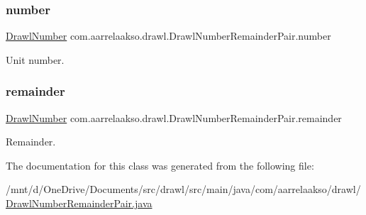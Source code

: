 \subsubsection{\texorpdfstring{number}{number}}
{\footnotesize\ttfamily \hyperlink{classcom_1_1aarrelaakso_1_1drawl_1_1_drawl_number}{Drawl\+Number} com.\+aarrelaakso.\+drawl.\+Drawl\+Number\+Remainder\+Pair.\+number\hspace{0.3cm}{\ttfamily [private]}}



Unit number. 

\mbox{\label{classcom_1_1aarrelaakso_1_1drawl_1_1_drawl_number_remainder_pair_a95c7e55169d65822bbceb08ff2f800dc}} 
\subsubsection{\texorpdfstring{remainder}{remainder}}
{\footnotesize\ttfamily \hyperlink{classcom_1_1aarrelaakso_1_1drawl_1_1_drawl_number}{Drawl\+Number} com.\+aarrelaakso.\+drawl.\+Drawl\+Number\+Remainder\+Pair.\+remainder\hspace{0.3cm}{\ttfamily [private]}}



Remainder. 



The documentation for this class was generated from the following file\+:\begin{DoxyCompactItemize}
\item 
/mnt/d/\+One\+Drive/\+Documents/src/drawl/src/main/java/com/aarrelaakso/drawl/\hyperlink{_drawl_number_remainder_pair_8java}{Drawl\+Number\+Remainder\+Pair.\+java}\end{DoxyCompactItemize}
